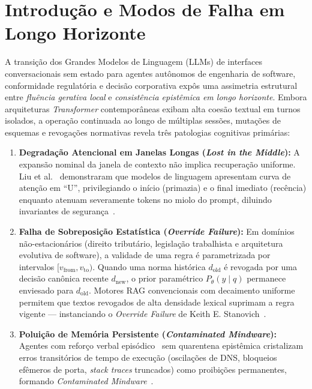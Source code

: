 \documentclass[10pt,twocolumn]{article}
\begin{document}
\begin{abstract}
\vspace{0.4em}
\noindent\textbf{Palavras-chave:} Arquitetura Cognitiva Ag\^entica; Bancos de Dados Bitemporais; Teoria Tripartite de Stanovich; Governan\c{c}a Epist\^emica; \emph{Reciprocal Rank Fusion}; \'Arvores de Merkle; \texttt{MemoryOS}.
\end{abstract}

\section{Introdu\c{c}\~ao e Modos de Falha em Longo Horizonte}

A transi\c{c}\~ao dos Grandes Modelos de Linguagem (LLMs) de interfaces conversacionais sem estado para agentes aut\^onomos de engenharia de software, conformidade regulat\'oria e decis\~ao corporativa exp\^os uma assimetria estrutural entre \emph{flu\^encia gerativa local} e \emph{consist\^encia epist\^emica em longo horizonte}. Embora arquiteturas \emph{Transformer} contempor\^aneas exibam alta coes\~ao textual em turnos isolados, a opera\c{c}\~ao continuada ao longo de m\'ultiplas sess\~oes, muta\c{c}\~oes de esquemas e revoga\c{c}\~oes normativas revela tr\^es patologias cognitivas prim\'arias:

\begin{enumerate}[leftmargin=*,nosep,itemsep=2pt]
    \item \textbf{Degrada\c{c}\~ao Atencional em Janelas Longas (\emph{Lost in the Middle}):} A expans\~ao nominal da janela de contexto n\~ao implica recupera\c{c}\~ao uniforme. Liu et al.~\cite{E03} demonstraram que modelos de linguagem apresentam curva de aten\c{c}\~ao em ``U'', privilegiando o in\'icio (primazia) e o final imediato (rec\^encia) enquanto atenuam severamente tokens no miolo do prompt, diluindo invariantes de seguran\c{c}a~\cite{E01,E02,E04}.
    \item \textbf{Falha de Sobreposi\c{c}\~ao Estat\'istica (\emph{Override Failure}):} Em dom\'inios n\~ao-estacion\'arios (direito tribut\'ario, legisla\c{c}\~ao trabalhista e arquitetura evolutiva de software), a validade de uma regra \'e parametrizada por intervalos $[v_{\mathrm{from}}, v_{\mathrm{to}})$. Quando uma norma hist\'orica $d_{\mathrm{old}}$ \'e revogada por uma decis\~ao can\^onica recente $d_{\mathrm{new}}$, o prior param\'etrico $P_{\theta}(y \mid q)$ permanece enviesado para $d_{\mathrm{old}}$. Motores RAG convencionais com decaimento uniforme~\cite{E08} permitem que textos revogados de alta densidade lexical suprimam a regra vigente --- instanciando o \emph{Override Failure} de Keith E. Stanovich~\cite{E20,E21}.
    \item \textbf{Polui\c{c}\~ao de Mem\'oria Persistente (\emph{Contaminated Mindware}):} Agentes com refor\c{c}o verbal epis\'odico~\cite{E18} sem quarentena epist\^emica cristalizam erros transit\'orios de tempo de execu\c{c}\~ao (oscila\c{c}\~oes de DNS, bloqueios ef\^emeros de porta, \emph{stack traces} truncados) como proibi\c{c}\~oes permanentes, formando \emph{Contaminated Mindware}~\cite{E20,E22}.
\end{enumerate}
\end{document}
